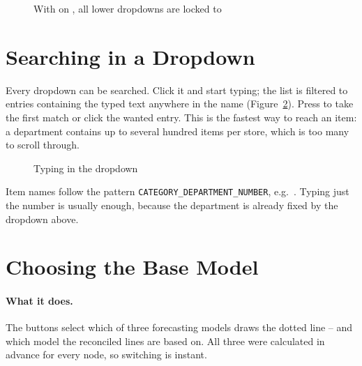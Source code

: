 \begin{figure}[H]
  \centering
  \caption{With  on , all lower dropdowns are locked to }
  \label{fig:fnLocked}
\end{figure}

\section{Searching in a Dropdown}
\label{sec:fnSearch}

Every dropdown can be searched. Click it and start typing; the list is filtered to entries containing the typed text anywhere in the name (Figure~\ref{fig:fnSearch}). Press  to take the first match or click the wanted entry. This is the fastest way to reach an item: a department contains up to several hundred items per store, which is too many to scroll through.

\begin{figure}[H]
  \centering
  \caption{Typing  in the  dropdown}
  \label{fig:fnSearch}
\end{figure}

\begin{TipBox}
Item names follow the pattern \texttt{CATEGORY\_DEPARTMENT\_NUMBER}, e.g.\ . Typing just the number is usually enough, because the department is already fixed by the dropdown above.
\end{TipBox}

\section{Choosing the Base Model}
\label{sec:fnBase}

\paragraph{What it does.} The  buttons  select which of three forecasting models draws the dotted line -- and which model the reconciled lines are based on. All three were calculated in advance for every node, so switching is instant.

